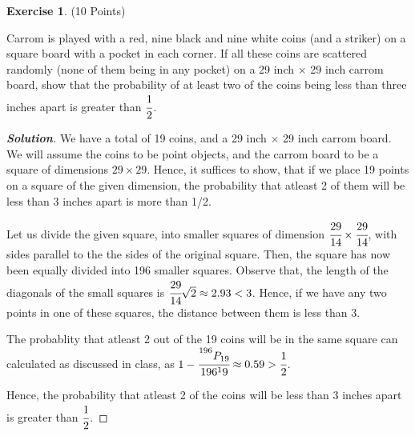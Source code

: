 \documentclass[10pt]{scrartcl}
\theoremstyle{definition}
\newtheorem{exercise}{Exercise}
\newenvironment{solution} {\begin{proof}[\normalfont \textbf{Solution}]} {\end{proof}}
\begin{document}
\begin{exercise}(10 Points)

    Carrom is played with a red, nine black and nine white coins (and a striker) on a square board
    with a pocket in each corner. If all these coins are scattered randomly (none of them being in
    any pocket) on a 29 inch $\times$ 29 inch carrom board, show that the probability of at least two of
    the coins being less than three inches apart is greater than $\cfrac{1}{2}$.
\end{exercise}
\begin{solution}
    We have a total of 19 coins, and a 29 inch $\times$ 29 inch carrom board. We will assume the coins to be point objects, 
    and the carrom board to be a square of dimensions $29 \times 29$. Hence, it suffices to show, that if we place 
    19 points on a square of the given dimension, the probability that atleast 2 of them will be less than 3 inches apart is 
    more than 1/2. 

    Let us divide the given square, into smaller squares of dimension $\cfrac{29}{14} \times \cfrac{29}{14}$, with sides parallel to the the sides of the original square. 
    Then, the square has now been equally divided into 196 smaller squares. Observe that, the length of the diagonals of the small squares is 
    $\cfrac{29}{14}\sqrt{2} \approx 2.93 < 3$. Hence, if we have any two points in one of these squares, the distance between them is less than 3.

    The probablity that atleast 2 out of the 19 coins will be in the same square can calculated as discussed in class, as 
    $1 - \cfrac{^{196}P_{19}}{196^19} \approx 0.59 > \cfrac{1}{2}$.

    Hence, the probability that atleast 2 of the coins will be less than 3 inches apart is greater than $\cfrac{1}{2}$.
\end{solution}
\end{document}
